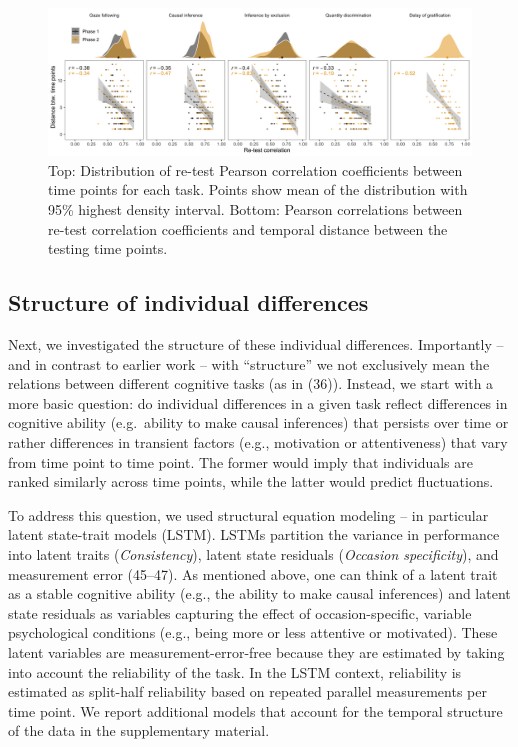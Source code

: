 \documentclass[
  man,floatsintext]{apa6}
\begin{document}
\begin{figure}
\includegraphics[width=1\linewidth]{./figures/reliability} \caption{Top: Distribution of re-test Pearson correlation coefficients between time points for each task. Points show mean of the distribution with 95\% highest density interval. Bottom: Pearson correlations between re-test correlation coefficients and temporal distance between the testing time points.}\label{fig:relplot}
\end{figure}

\hypertarget{structure-of-individual-differences}{%
\subsection{Structure of individual differences}\label{structure-of-individual-differences}}

Next, we investigated the structure of these individual differences. Importantly -- and in contrast to earlier work -- with ``structure'' we not exclusively mean the relations between different cognitive tasks (as in (36)). Instead, we start with a more basic question: do individual differences in a given task reflect differences in cognitive ability (e.g.~ability to make causal inferences) that persists over time or rather differences in transient factors (e.g., motivation or attentiveness) that vary from time point to time point. The former would imply that individuals are ranked similarly across time points, while the latter would predict fluctuations.

To address this question, we used structural equation modeling -- in particular latent state-trait models (LSTM). LSTMs partition the variance in performance into latent traits (\emph{Consistency}), latent state residuals (\emph{Occasion specificity}), and measurement error (45--47). As mentioned above, one can think of a latent trait as a stable cognitive ability (e.g., the ability to make causal inferences) and latent state residuals as variables capturing the effect of occasion-specific, variable psychological conditions (e.g., being more or less attentive or motivated). These latent variables are measurement-error-free because they are estimated by taking into account the reliability of the task. In the LSTM context, reliability is estimated as split-half reliability based on repeated parallel measurements per time point. We report additional models that account for the temporal structure of the data in the supplementary material.
\end{document}
